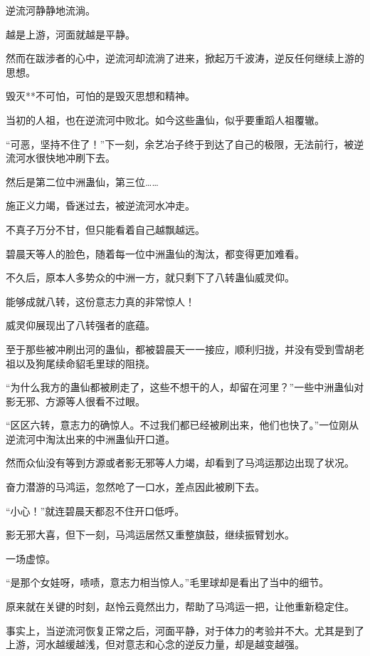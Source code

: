 
\begin{this_body}

逆流河静静地流淌。

越是上游，河面就越是平静。

然而在跋涉者的心中，逆流河却流淌了进来，掀起万千波涛，逆反任何继续上游的思想。

毁灭**不可怕，可怕的是毁灭思想和精神。

当初的人祖，也在逆流河中败北。如今这些蛊仙，似乎要重蹈人祖覆辙。

“可恶，坚持不住了！”下一刻，余艺冶子终于到达了自己的极限，无法前行，被逆流河水很快地冲刷下去。

然后是第二位中洲蛊仙，第三位……

施正义力竭，昏迷过去，被逆流河水冲走。

不真子万分不甘，但只能看着自己越飘越远。

碧晨天等人的脸色，随着每一位中洲蛊仙的淘汰，都变得更加难看。

不久后，原本人多势众的中洲一方，就只剩下了八转蛊仙威灵仰。

能够成就八转，这份意志力真的非常惊人！

威灵仰展现出了八转强者的底蕴。

至于那些被冲刷出河的蛊仙，都被碧晨天一一接应，顺利归拢，并没有受到雪胡老祖以及狗尾续命貂毛里球的阻挠。

“为什么我方的蛊仙都被刷走了，这些不想干的人，却留在河里？”一些中洲蛊仙对影无邪、方源等人很看不过眼。

“区区六转，意志力的确惊人。不过我们都已经被刷出来，他们也快了。”一位刚从逆流河中淘汰出来的中洲蛊仙开口道。

然而众仙没有等到方源或者影无邪等人力竭，却看到了马鸿运那边出现了状况。

奋力潜游的马鸿运，忽然呛了一口水，差点因此被刷下去。

“小心！”就连碧晨天都忍不住开口低呼。

影无邪大喜，但下一刻，马鸿运居然又重整旗鼓，继续振臂划水。

一场虚惊。

“是那个女娃呀，啧啧，意志力相当惊人。”毛里球却是看出了当中的细节。

原来就在关键的时刻，赵怜云竟然出力，帮助了马鸿运一把，让他重新稳定住。

事实上，当逆流河恢复正常之后，河面平静，对于体力的考验并不大。尤其是到了上游，河水越缓越浅，但对意志和心念的逆反力量，却是越变越强。


\end{this_body}
